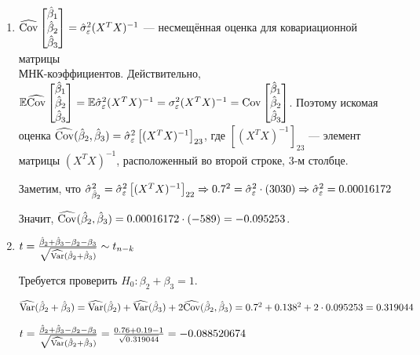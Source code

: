 \documentclass[pdftex,11pt,openany]{book}\usepackage[]{graphicx}\usepackage[]{color}
\begin{document}
\begin{solution}
\begin{enumerate}
\item $\widehat{\operatorname{Cov}}\begin{bmatrix}
\hat{\beta}_1 \\
\hat{\beta}_2 \\
\hat{\beta}_3 \\
\end{bmatrix} = \hat{\sigma}_{\varepsilon}^2 (X^TX)^{-1}$ --- несмещённая оценка для ковариационной матрицы \\ МНК-коэффициентов. Действительно, $\mathbb{E}\widehat{\operatorname{Cov}}\begin{bmatrix}
\hat{\beta}_1 \\
\hat{\beta}_2 \\
\hat{\beta}_3 \\
\end{bmatrix} = \mathbb{E}\hat{\sigma}_{\varepsilon}^2 (X^TX)^{-1} = \sigma_{\varepsilon}^2 (X^TX)^{-1} = \operatorname{Cov}\begin{bmatrix}
\hat{\beta}_1 \\
\hat{\beta}_2 \\
\hat{\beta}_3 \\
\end{bmatrix}$. Поэтому искомая оценка $\widehat{\operatorname{Cov}}(\hat{\beta}_2, \hat{\beta}_3) = \hat{\sigma}_{\varepsilon}^2 \left[ (X^T X)^{-1} \right]_{23}$, где $\left[ (X^T X)^{-1} \right]_{23}$ --- элемент матрицы $(X^T X)^{-1}$, расположенный во второй строке, 3-м столбце.

Заметим, что $\hat{\sigma}_{\hat{\beta}_2}^2 = \hat{\sigma}_{\varepsilon}^2 \left[ (X^T X)^{-1} \right]_{22} \Rightarrow 0.7^2 = \hat{\sigma}_{\varepsilon}^2 \cdot (3030) \Rightarrow \hat{\sigma}_{\varepsilon}^2 = 0.00016172$

Значит, $\widehat{\operatorname{Cov}}(\hat{\beta}_2, \hat{\beta}_3) = 0.00016172 \cdot (-589) = -0.095253$.

\item $t = \frac{\hat{\beta}_2 + \hat{\beta}_3 - \beta_2 - \beta_3}{\sqrt{\widehat{\operatorname{Var}}(\hat{\beta}_2 + \hat{\beta}_3)}} \sim t_{n-k}$

Требуется проверить $H_0: \beta_2 + \beta_3 = 1$.

$\widehat{\operatorname{Var}}(\hat{\beta}_2 + \hat{\beta}_3) = \widehat{\operatorname{Var}}(\hat{\beta}_2) + \widehat{\operatorname{Var}}(\hat{\beta}_3) + 2\widehat{\operatorname{Cov}}(\hat{\beta}_2, \hat{\beta}_3) = 0.7^2 + 0.138^2 + 2 \cdot 0.095253 = 0.319044$

$t = \frac{\hat{\beta}_2 + \hat{\beta}_3 - \beta_2 - \beta_3}{\sqrt{\widehat{\operatorname{Var}}(\hat{\beta}_2 + \hat{\beta}_3)}} = \frac{0.76 + 0.19 - 1}{\sqrt{0.319044}} = -0.088520674$


\end{enumerate}
\end{solution}
\end{document}
